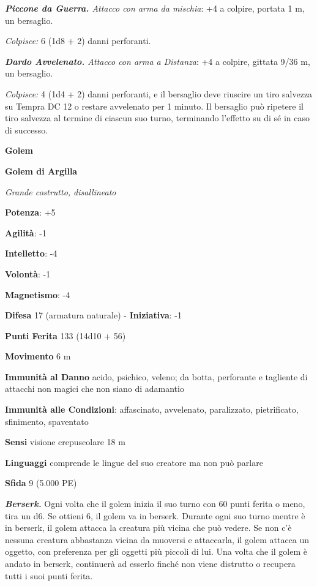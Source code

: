 \begin{multicols}{2}
\emph{\textbf{Piccone da Guerra.} Attacco con arma da mischia}: +4 a
colpire, portata 1 m, un bersaglio.

\emph{Colpisce:} 6 (1d8 + 2) danni perforanti.

\emph{\textbf{Dardo Avvelenato.} Attacco con arma a Distanza}: +4 a
colpire, gittata 9/36 m, un bersaglio.

\emph{Colpisce:} 4 (1d4 + 2) danni perforanti, e il bersaglio deve
riuscire un tiro salvezza su Tempra DC 12 o restare avvelenato per
1 minuto. Il bersaglio può ripetere il tiro salvezza al termine di
ciascun suo turno, terminando l'effetto su di sé in caso di successo.

\textbf{Golem}

\textbf{Golem di Argilla}

\emph{Grande costrutto, disallineato}

\textbf{Potenza}: +5

\textbf{Agilità}: -1

\textbf{Intelletto}: -4

\textbf{Volontà}: -1

\textbf{Magnetismo}: -4

\textbf{Difesa} 17 (armatura naturale) - \textbf{Iniziativa}: -1

\textbf{Punti Ferita} 133 (14d10 + 56)

\textbf{Movimento} 6 m

\textbf{Immunità al Danno} acido, psichico, veleno; da botta,
perforante e tagliente di attacchi non magici che non siano di adamantio

\textbf{Immunità alle Condizioni}: affascinato, avvelenato, paralizzato,
pietrificato, sfinimento, spaventato

\textbf{Sensi} visione crepuscolare 18 m

\textbf{Linguaggi} comprende le lingue del suo creatore ma non può
parlare

\textbf{Sfida} 9 (5.000 PE)\smallskip

\emph{\textbf{Berserk.}} Ogni volta che il golem inizia il suo turno con
60 punti ferita o meno, tira un d6. Se ottieni 6, il golem va in
berserk. Durante ogni suo turno mentre è in berserk, il golem attacca la
creatura più vicina che può vedere. Se non c'è nessuna creatura
abbastanza vicina da muoversi e attaccarla, il golem attacca un oggetto,
con preferenza per gli oggetti più piccoli di lui. Una volta che il
golem è andato in berserk, continuerà ad esserlo finché non viene
distrutto o recupera tutti i suoi punti ferita.


\end{multicols}
